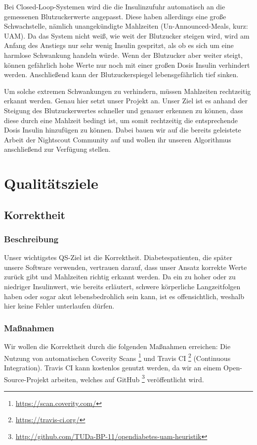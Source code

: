 \documentclass[accentcolor=tud0b,12pt,paper=a4]{tudreport}
\begin{document}
Bei Closed-Loop-Systemen wird die die Insulinzufuhr automatisch an die gemessenen Blutzuckerwerte angepasst. Diese haben allerdings eine große Schwachstelle, nämlich unangekündigte Mahlzeiten (Un-Announced-Meals, kurz: UAM). Da das System nicht weiß, wie weit der Blutzucker steigen wird, wird am Anfang des Anstiegs nur sehr wenig Insulin gespritzt, als ob es sich um eine harmlose Schwankung handeln würde. Wenn der Blutzucker aber weiter steigt, können gefährlich hohe Werte nur noch mit einer großen Dosis Insulin verhindert werden. Anschließend kann der Blutzuckerspiegel lebensgefährlich tief sinken.

Um solche extremen Schwankungen zu verhindern, müssen Mahlzeiten rechtzeitig erkannt werden. Genau hier setzt unser Projekt an. Unser Ziel ist es anhand der Steigung des Blutzuckerwertes schneller und genauer erkennen zu können, dass diese durch eine Mahlzeit bedingt ist, um somit rechtzeitig die entsprechende Dosis Insulin hinzufügen zu können. Dabei bauen wir auf die bereits geleistete Arbeit der Nightscout Community auf und wollen ihr unseren Algorithmus anschließend zur Verfügung stellen.





	\chapter{Qualitätsziele}
        \section{Korrektheit}
    
	\subsection{Beschreibung}
Unser wichtigstes QS-Ziel ist die Korrektheit. Diabetespatienten, die später unsere Software verwenden, vertrauen darauf, dass unser Ansatz korrekte Werte zurück gibt und Mahlzeiten richtig erkannt werden. Da ein zu hoher oder zu niedriger Insulinwert, wie bereits erläutert, schwere körperliche Langzeitfolgen haben oder sogar akut lebensbedrohlich sein kann, ist es offensichtlich, weshalb hier keine Fehler unterlaufen dürfen.

	\subsection{Maßnahmen}
Wir wollen die Korrektheit durch die folgenden Maßnahmen erreichen: Die Nutzung von automatischen Coverity Scans \footnote{\url{https://scan.coverity.com/}} und Travis CI \footnote{\url{https://travis-ci.org/}} (Continuous Integration). Travis CI kann kostenlos genutzt werden, da wir an einem Open-Source-Projekt arbeiten, welches auf GitHub \footnote{\url{http://github.com/TUDa-BP-11/opendiabetes-uam-heuristik}} veröffentlicht wird.
\end{document}

